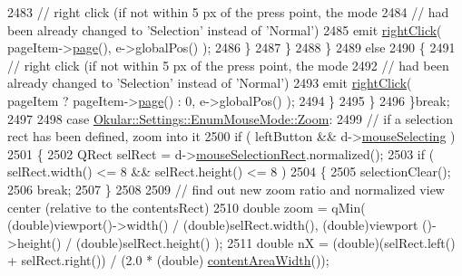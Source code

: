 \begin{DoxyCode}
2483                             \textcolor{comment}{// right click (if not within 5 px of the press point, the mode}
2484                             \textcolor{comment}{// had been already changed to 'Selection' instead of 'Normal')}
2485                             emit \hyperlink{classPageView_a51ac8814a8f47fd02ac0b61627ad164f}{rightClick}( pageItem->\hyperlink{classPageViewItem_a5c512d95e5563e8d19d1fb3d93dafc31}{page}(), e->globalPos() );
2486                         \}
2487                     \}
2488                 \}
2489                 \textcolor{keywordflow}{else}
2490                 \{
2491                     \textcolor{comment}{// right click (if not within 5 px of the press point, the mode}
2492                     \textcolor{comment}{// had been already changed to 'Selection' instead of 'Normal')}
2493                     emit \hyperlink{classPageView_a51ac8814a8f47fd02ac0b61627ad164f}{rightClick}( pageItem ? pageItem->\hyperlink{classPageViewItem_a5c512d95e5563e8d19d1fb3d93dafc31}{page}() : 0, e->globalPos() );
2494                 \}
2495             \}
2496             \}\textcolor{keywordflow}{break};
2497 
2498         \textcolor{keywordflow}{case} \hyperlink{classOkular_1_1Settings_1_1EnumMouseMode_ab2ae04e2d7d069f02195ccf32c52415ba02b6269995c57d3fa3c40c5301591e62}{Okular::Settings::EnumMouseMode::Zoom}:
2499             \textcolor{comment}{// if a selection rect has been defined, zoom into it}
2500             \textcolor{keywordflow}{if} ( leftButton && d->\hyperlink{classPageViewPrivate_a8819b152a8279b75359af2a3e0567681}{mouseSelecting} )
2501             \{
2502                 QRect selRect = d->\hyperlink{classPageViewPrivate_a94473cb593838a977bea89214bd1ef66}{mouseSelectionRect}.normalized();
2503                 \textcolor{keywordflow}{if} ( selRect.width() <= 8 && selRect.height() <= 8 )
2504                 \{
2505                     selectionClear();
2506                     \textcolor{keywordflow}{break};
2507                 \}
2508 
2509                 \textcolor{comment}{// find out new zoom ratio and normalized view center (relative to the contentsRect)}
2510                 \textcolor{keywordtype}{double} zoom = qMin( (\textcolor{keywordtype}{double})viewport()->width() / (\textcolor{keywordtype}{double})selRect.width(), (double)viewport
      ()->height() / (double)selRect.height() );
2511                 \textcolor{keywordtype}{double} nX = (double)(selRect.left() + selRect.right()) / (2.0 * (\textcolor{keywordtype}{double})
      \hyperlink{classPageView_acaead56a0e9efe0ad73e8c532fa9f160}{contentAreaWidth}());

\end{DoxyCode}
